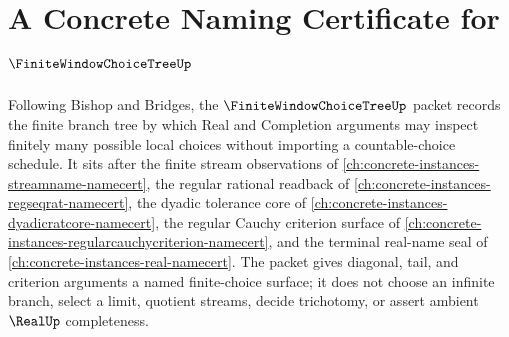 \chapter{A Concrete Naming Certificate for $\FiniteWindowChoiceTreeUp$}
\label{ch:concrete-instances-finite-window-choice-tree-namecert}

Following Bishop and Bridges, the $\FiniteWindowChoiceTreeUp$ packet records the finite branch tree by which Real and Completion arguments may inspect finitely many possible local choices without importing a countable-choice schedule. It sits after the finite stream observations of \autoref{ch:concrete-instances-streamname-namecert}, the regular rational readback of \autoref{ch:concrete-instances-regseqrat-namecert}, the dyadic tolerance core of \autoref{ch:concrete-instances-dyadicratcore-namecert}, the regular Cauchy criterion surface of \autoref{ch:concrete-instances-regularcauchycriterion-namecert}, and the terminal real-name seal of \autoref{ch:concrete-instances-real-namecert}. The packet gives diagonal, tail, and criterion arguments a named finite-choice surface; it does not choose an infinite branch, select a limit, quotient streams, decide trichotomy, or assert ambient $\RealUp$ completeness.

